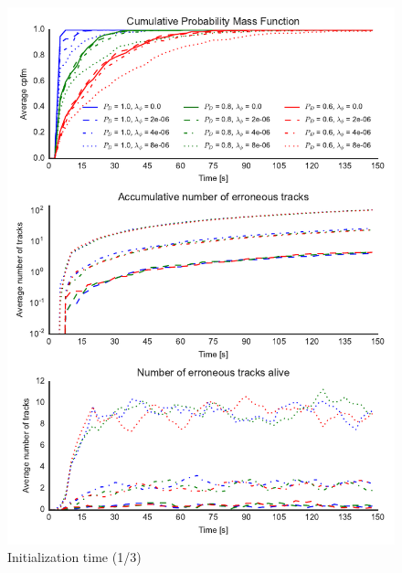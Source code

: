 \begin{figure}
\centering
\includegraphics{Figures/plots/Scenario1_Init-Time(1-3).pdf}
\caption{Initialization time (1/3)}\label{fig:init_time_1-3}
\end{figure}

